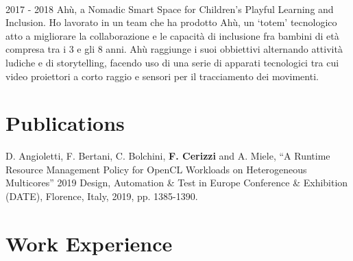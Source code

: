 \documentclass[letterpaper]{twentysecondcvit} %
\begin{document}
\begin{twenty}
        \\
    \twentyitem
        {2017 - 2018}
        {}
        {Ahù, a Nomadic Smart Space for Children’s Playful Learning and Inclusion.}
        {}
        {
        Ho lavorato in un team che ha prodotto Ahù, un `totem' tecnologico atto a migliorare la collaborazione e le capacità di inclusione fra bambini di età compresa tra i 3 e gli 8 anni. Ahù raggiunge i suoi obbiettivi alternando attività ludiche e di storytelling, facendo uso di una serie di apparati tecnologici tra cui video proiettori a corto raggio e sensori per il tracciamento dei movimenti.
        {
        }
        }
        {\footnotesize{}}
        \\
\end{twenty}


\section{Publications}
D. Angioletti, F. Bertani, C. Bolchini, \textbf{F. Cerizzi} and A. Miele, “A Runtime Resource Management Policy for OpenCL Workloads on Heterogeneous Multicores” 2019 Design, Automation \& Test in Europe Conference \& Exhibition (DATE), Florence, Italy, 2019, pp. 1385-1390.\\ {\footnotesize{}}
\vspace{2mm}


\newpage
\makenewprofile


\section{Work Experience}
\end{document}
